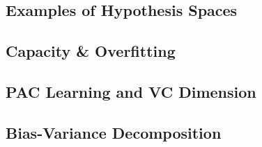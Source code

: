 
\subsection{Examples of Hypothesis Spaces}


\subsection{Capacity \& Overfitting}


\subsection{PAC Learning and VC Dimension}


\subsection{Bias-Variance Decomposition}


